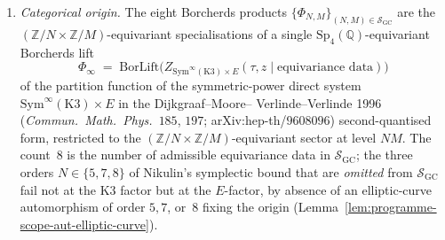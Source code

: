\begin{conjecture}
\begin{enumerate}[label=(\roman*), leftmargin=2em, itemsep=0.35ex]
\item \emph{Categorical origin.} The eight Borcherds products
$\{\Phi_{N, M}\}_{(N, M) \in \mathcal{S}_{\mathrm{GC}}}$ are the
$(\mathbb{Z}/N \times \mathbb{Z}/M)$-equivariant specialisations of a
single $\mathrm{Sp}_4(\mathbb{Q})$-equivariant Borcherds lift
\[
 \Phi_\infty
 \;=\;
 \mathrm{BorLift}\bigl(
 Z_{\mathrm{Sym}^\infty(\mathrm{K3}) \times E}
 (\tau, z \mid \text{equivariance data})
 \bigr)
\]
of the partition function of the symmetric-power direct system
$\mathrm{Sym}^\infty(\mathrm{K3}) \times E$ in the Dijkgraaf--Moore--
Verlinde--Verlinde 1996 (\emph{Commun.\ Math.\ Phys.}~$185$, $197$;
arXiv:hep-th/$9608096$) second-quantised form, restricted to the
$(\mathbb{Z}/N \times \mathbb{Z}/M)$-equivariant sector at level $NM$.
The count~$8$ is the number of admissible equivariance data in
$\mathcal{S}_{\mathrm{GC}}$; the three orders $N \in \{5, 7, 8\}$ of
Nikulin's symplectic bound that are \emph{omitted} from
$\mathcal{S}_{\mathrm{GC}}$ fail not at the K3 factor but at the
$E$-factor, by absence of an elliptic-curve automorphism of order
$5, 7$, or~$8$ fixing the origin
(Lemma~\ref{lem:programme-scope-aut-elliptic-curve}).
\end{enumerate}
\end{conjecture}

